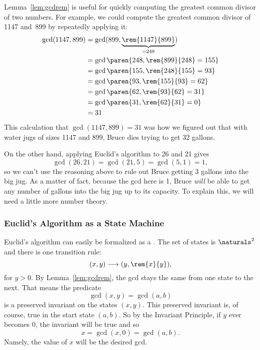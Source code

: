 Lemma~\ref{lem:gcdrem} is useful for quickly computing the greatest
common divisor of two numbers.  For example, we could compute the
greatest common divisor of 1147 and~899 by repeatedly applying it:
\begin{align*}
\gcd(1147, 899) &= \gcd(899, \underbrace{\rem{1147}{899}}_{{} = 248}) \\
&= \gcd\paren{248, \rem{899}{248} = 155} \\
&= \gcd\paren{155, \rem{248}{155} = 93} \\
&= \gcd\paren{ 93, \rem{155}{93} = 62}\\
&= \gcd\paren{ 62, \rem{93}{62} = 31} \\
&= \gcd\paren{ 31, \rem{62}{31} = 0} \\
&= 31
\end{align*}
This calculation that $\gcd(1147, 899) = 31$ was how we figured out
that with water jugs of sizes 1147 and 899, Bruce dies trying to get
32 gallons.

On the other hand, applying Euclid's algorithm to 26 and 21 gives
\[
\gcd(26, 21) = \gcd(21, 5) = \gcd(5, 1) = 1,
\]
so we can't use the reasoning above to rule out Bruce getting 3
gallons into the big jug.  As a matter of fact, because the gcd here
is 1, Bruce \emph{will} be able to get any number of gallons into the big jug
up to its capacity.  To explain this, we will need a little more
number theory.

\subsubsection{Euclid's Algorithm as a State Machine}
Euclid's algorithm can easily be formalized as a .  The set of states is $\naturals^2$ and there is one
transition rule:
\begin{equation}\label{euclid_transition}
(x,y) \movesto (y, \rem{x}{y}),
\end{equation}
for $y>0$.  By Lemma~\ref{lem:gcdrem}, the gcd stays the same from one
state to the next.  That means the predicate
\[
\gcd(x,y) = \gcd(a,b)
\]
is a preserved invariant on the states $(x,y)$.  This preserved
invariant is, of course, true in the start state $(a,b)$.  So by the
Invariant Principle, if $y$ ever becomes $0$, the invariant will be
true and so
\[
x = \gcd(x,0) = \gcd(a,b).
\]
Namely, the value of $x$ will be the desired gcd.

